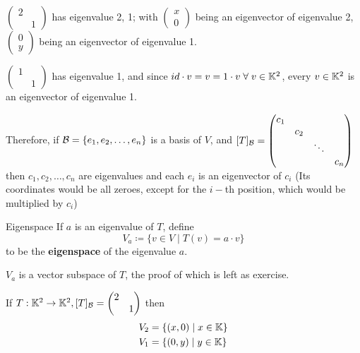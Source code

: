 \begin{example}
    \(\begin{pmatrix}
        2 &   \\
          & 1
    \end{pmatrix}\) has eigenvalue 2, 1; with \(\begin{pmatrix}
        x \\ 0
    \end{pmatrix}\) being an eigenvector of eigenvalue 2, \(\begin{pmatrix}
        0 \\
        y
    \end{pmatrix}\) being an eigenvector of eigenvalue 1.

    \(\begin{pmatrix}
        1 &   \\
          & 1
    \end{pmatrix}\) has eigenvalue 1, and since \(id \cdot v = v = 1 \cdot v \forall v \in \bbk^2\), every \(v \in \mathbb{K}^2\) is an eigenvector of eigenvalue 1.
\end{example}

Therefore, if \(\mathcal{B} = \{e_1, e_2, \ldots, e_n\}\) is a basis of \(V\), and \([T]_{\mathcal{B}} = \begin{pmatrix}
    c_1 &     &        &     \\
        & c_2 &        &     \\
        &     & \ddots &     \\
        &     &        & c_n
\end{pmatrix}\) then \(c_1, c_2, \ldots, c_n\) are eigenvalues and each \(e_i\) is an eigenvector of \(c_i\) (Its coordinates would be all zeroes, except for the \(i-\)th position, which would be multiplied by \(c_i\))

\begin{definition} {Eigenspace}
    If \(a\) is an eigenvalue of \(T\), define \[
        V_a \coloneqq \{v \in V \mid T(v) = a\cdot v\}
    \]
    to be the \textbf{eigenspace} of the eigenvalue \(a\).
\end{definition}

\begin{claim}
    \(V_a\) is a vector subspace of \(T\), the proof of which is left as exercise.
\end{claim}

\begin{example}
    If \(T: \mathbb{K}^2 \to \mathbb{K}^2, [T]_{\mathcal{B}} = \begin{pmatrix}
        2 &   \\
          & 1
    \end{pmatrix}\) then \begin{align*}
        V_2 & = \{(x, 0) \mid x \in \mathbb{K}\} \\
        V_1 & = \{(0, y) \mid y \in \mathbb{K}\}
    \end{align*}
\end{example}

